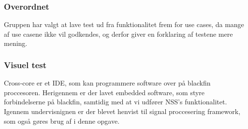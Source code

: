 \subsubsection{Overordnet}
Gruppen har valgt at lave test ud fra funktionalitet frem for use cases, da mange af use casene ikke vil godkendes, og derfor giver en forklaring af testene mere mening. 
 
\subsubsection{Visuel test}
Cross-core er et IDE, som kan programmere software over på blackfin proccesoren. Herigennem er der lavet embedded software, som styre forbindelserne på blackfin, samtidig med at vi udfører NSS's funktionalitet. Igennem undervisnignen er der blevet henvist til signal proccesering framework, som også gøres brug af i denne opgave. 


